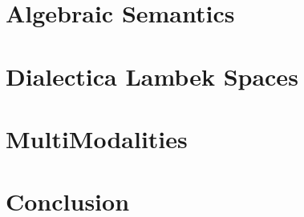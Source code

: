 \documentclass{article}
\begin{document}
\section{Algebraic Semantics}

\section{Dialectica Lambek Spaces}

\section{MultiModalities}
\section{Conclusion}



\end{document}
